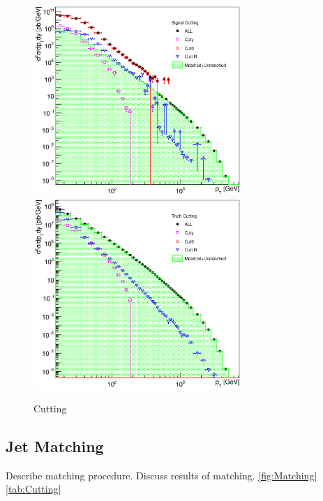 \begin{figure}[p]
  \centering
  \includegraphics[width=0.7\textwidth]{Chapter3/SignalCutting.eps}
  \includegraphics[width=0.7\textwidth]{Chapter3/TruthCutting.eps}
  \caption{Cutting}
  \label{fig:Cutting}
\end{figure}

\subsection{Jet Matching}

Describe matching procedure.  
Discuss results of matching.
\ref{fig:Matching}
\ref{tab:Cutting}


